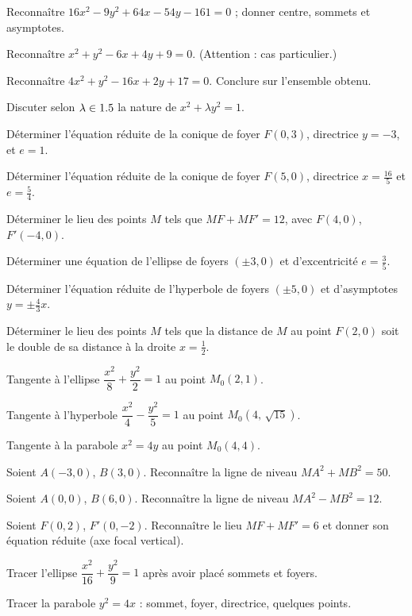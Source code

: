 \exo{} Reconnaître $16x^{2}-9y^{2}+64x-54y-161=0$ ; donner centre, sommets et
asymptotes.

\exo{} Reconnaître $x^{2}+y^{2}-6x+4y+9=0$. (Attention : cas particulier.)

\exo{} Reconnaître $4x^{2}+y^{2}-16x+2y+17=0$. Conclure sur l'ensemble obtenu.

\exo{} Discuter selon $\lambda\in1.5$ la nature de
$x^{2}+\lambda y^{2}=1$.

\exo{} Déterminer l'équation réduite de la conique de foyer $F(0,3)$, directrice
$y=-3$, et $e=1$.

\exo{} Déterminer l'équation réduite de la conique de foyer $F(5,0)$, directrice
$x=\tfrac{16}5$ et $e=\tfrac54$.

\exo{} Déterminer le lieu des points $M$ tels que $MF+MF'=12$, avec $F(4,0)$,
$F'(-4,0)$.

\exo{} Déterminer une équation de l'ellipse de foyers $(\pm3,0)$ et d'excentricité
$e=\tfrac35$.

\exo{} Déterminer l'équation réduite de l'hyperbole de foyers $(\pm5,0)$ et
d'asymptotes $y=\pm\tfrac43 x$.

\exo{} Déterminer le lieu des points $M$ tels que la distance de $M$ au point
$F(2,0)$ soit le double de sa distance à la droite $x=\tfrac12$.

\exo{} Tangente à l'ellipse $\dfrac{x^{2}}{8}+\dfrac{y^{2}}{2}=1$ au point
$M_0(2,1)$.

\exo{} Tangente à l'hyperbole $\dfrac{x^{2}}{4}-\dfrac{y^{2}}{5}=1$ au point
$M_0(4,\,\sqrt{15})$.

\exo{} Tangente à la parabole $x^{2}=4y$ au point $M_0(4,4)$.

\exo{} Soient $A(-3,0)$, $B(3,0)$. Reconnaître la ligne de niveau
$MA^{2}+MB^{2}=50$.

\exo{} Soient $A(0,0)$, $B(6,0)$. Reconnaître la ligne de niveau
$MA^{2}-MB^{2}=12$.

\exo{} Soient $F(0,2)$, $F'(0,-2)$. Reconnaître le lieu $MF+MF'=6$ et donner son
équation réduite (axe focal vertical).

\exo{} Tracer l'ellipse $\dfrac{x^{2}}{16}+\dfrac{y^{2}}{9}=1$ après avoir placé
sommets et foyers.

\exo{} Tracer la parabole $y^{2}=4x$ : sommet, foyer, directrice, quelques points.

